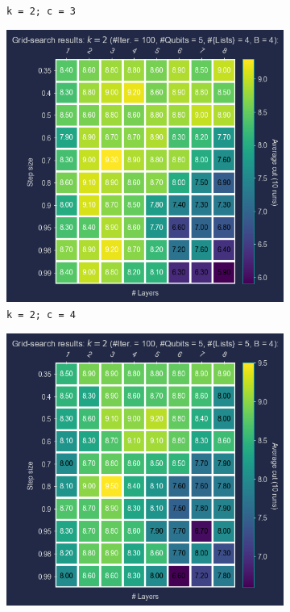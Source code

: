 \begin{figure}[ht!]
\begin{subfigure}[b]{0.325\textwidth}
      \caption{\texttt{k = 2; c = 3}}
      \label{fig:k=2;c=3}
  \end{subfigure}
  \hfill
      \begin{subfigure}[b]{0.325\textwidth}
      \centering
      \includegraphics[width=1\textwidth]{Figures/Chapter_5/k=2(Grid_Search)/iQAQE_k2_Grid_Search_step_size_n_layers_c=4.png}
      \caption{\texttt{k = 2; c = 4}}
      \label{fig:k=2;c=4}
  \end{subfigure}
  \bigskip
  \begin{subfigure}[b]{0.325\textwidth}
      \addtocounter{subfigure}{3} %
      \centering
      \includegraphics[width=1\textwidth]{Figures/Chapter_5/k=2(Grid_Search)/iQAQE_k2_Grid_Search_step_size_n_layers_c=5.png}

\end{subfigure}
\end{figure}
